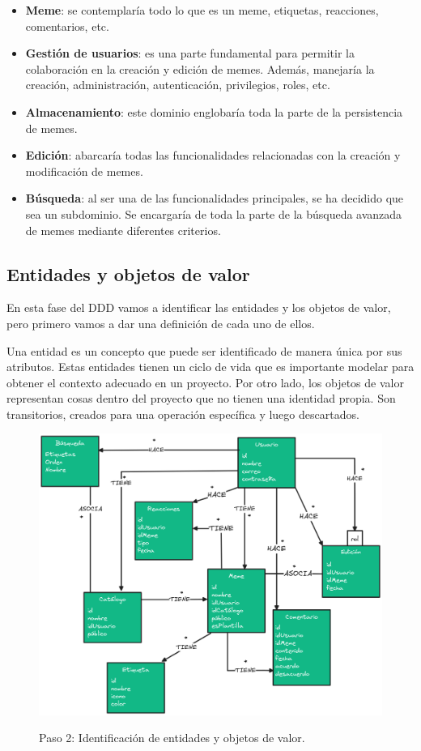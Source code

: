 \begin{itemize}
    \item \textbf{Meme}: se contemplaría todo lo que es un meme, etiquetas, reacciones, comentarios, etc.
    \item \textbf{Gestión de usuarios}: es una parte fundamental para permitir la colaboración en la creación y edición de memes. Además, manejaría la creación, administración, autenticación, privilegios, roles, etc.
    \item \textbf{Almacenamiento}: este dominio englobaría toda la parte de la persistencia de memes.
    \item \textbf{Edición}: abarcaría todas las funcionalidades relacionadas con la creación y modificación de memes.
    \item \textbf{Búsqueda}: al ser una de las funcionalidades principales, se ha decidido que sea un subdominio. Se encargaría de toda la parte de la búsqueda avanzada de memes mediante diferentes criterios.
\end{itemize}

\subsection{Entidades y objetos de valor}

En esta fase del DDD vamos a identificar las entidades y los objetos de valor, pero primero vamos a dar una definición de cada uno de ellos.

Una entidad es un concepto que puede ser identificado de manera única por sus atributos. Estas entidades tienen un ciclo de vida que es importante modelar para obtener el contexto adecuado en un proyecto. Por otro lado, los objetos de valor representan cosas dentro del proyecto que no tienen una identidad propia. Son transitorios, creados para una operación específica y luego descartados.

\begin{figure}[H]
    \caption{Paso 2: Identificación de entidades y objetos de valor.}
    \centering
    \vspace*{0.5cm}
    \includegraphics[scale=0.2]{figuras/paso2.png}\label{fig:figuras/paso2.png}
\end{figure}

